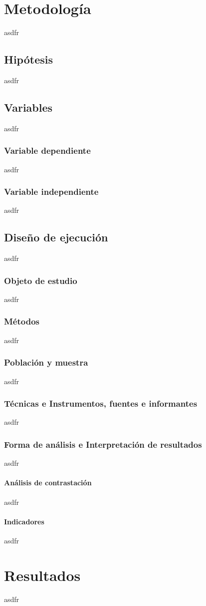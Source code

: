 \documentclass{report}
\begin{document}
\chapter{Metodología}
asdfr
\section{Hipótesis}
asdfr
\section{Variables}
asdfr
\subsection{Variable dependiente}
asdfr
\subsection{Variable independiente}
asdfr
\section{Diseño de ejecución}
asdfr
\subsection{Objeto de estudio}
asdfr
\subsection{Métodos}
asdfr
\subsection{Población y muestra}
asdfr
\subsection{Técnicas e Instrumentos, fuentes e informantes}
asdfr
\subsection{Forma de análisis e Interpretación de resultados}
asdfr
\subsubsection{Análisis de contrastación}
asdfr
\subsubsection{Indicadores}
asdfr
\chapter{Resultados}
asdfr
\end{document}
